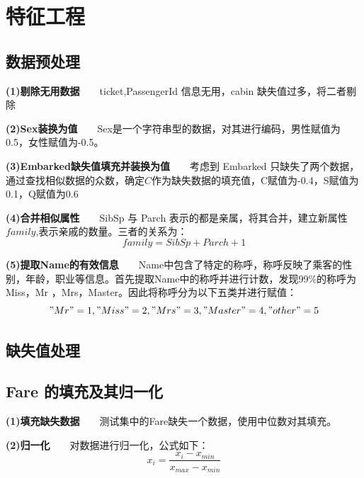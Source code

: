\section{特征工程}
\subsection{数据预处理}
\textbf{(1)剔除无用数据}~~~~ticket,PassengerId 信息无用，cabin 缺失值过多，将二者剔除

\textbf{(2)Sex装换为值}~~~~Sex是一个字符串型的数据，对其进行编码，男性赋值为0.5，女性赋值为-0.5。

\textbf{(3)Embarked缺失值填充并装换为值}~~~~考虑到 Embarked 只缺失了两个数据，通过查找相似数据的众数，确定$C$作为缺失数据的填充值，C赋值为-0.4，S赋值为0.1，Q赋值为0.6

\textbf{(4)合并相似属性}~~~~SibSp 与 Parch 表示的都是亲属，将其合并，建立新属性$family$,表示亲戚的数量。三者的关系为：
$$family=SibSp+Parch+1$$

\textbf{(5)提取Name的有效信息}~~~~Name中包含了特定的称呼，称呼反映了乘客的性别，年龄，职业等信息。首先提取Name中的称呼并进行计数，发现99\%的称呼为Miss，Mr ，Mrs，Master。因此将称呼分为以下五类并进行赋值：
$$"Mr"=1, "Miss"= 2, "Mrs"= 3, "Master"= 4, "other"= 5$$
\subsection{缺失值处理}
\subsection{Fare 的填充及其归一化}
\textbf{(1)填充缺失数据}~~~~测试集中的Fare缺失一个数据，使用中位数对其填充。

\textbf{(2)归一化}~~~~对数据进行归一化，公式如下：
$$x_i=\frac{x_i-x_{min}}{x_{max}-x_{min}}$$
